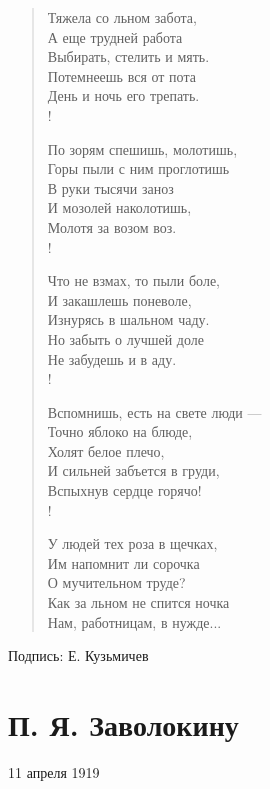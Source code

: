\documentclass[]{memoir}
\begin{document}
\begin{verse}
Тяжела со льном забота,\\
А еще трудней работа\\
          Выбирать, стелить и мять.\\
Потемнеешь вся от пота\\
          День и ночь его трепать.\\!

По зорям спешишь, молотишь,\\
Горы пыли с ним проглотишь\\
          В руки тысячи заноз\\
И мозолей наколотишь,\\
          Молотя за возом воз.\\!

Что не взмах, то пыли боле,\\
И закашлешь поневоле,\\
          Изнурясь в шальном чаду.\\
Но забыть о лучшей доле\\
          Не забудешь и в аду.\\!

Вспомнишь, есть на свете люди ---\\
Точно яблоко на блюде,\\
          Холят белое плечо,\\
И сильней забъется в груди,\\
          Вспыхнув сердце горячо!\\!

У людей тех роза в щечках,\\
Им напомнит ли сорочка\\
          О мучительном труде?\\
Как за льном не спится ночка\\
          Нам, работницам, в нужде...
\end{verse}

Подпись: Е. Кузьмичев


\section{П. Я. Заволокину}
11 апреля 1919






\end{document}
